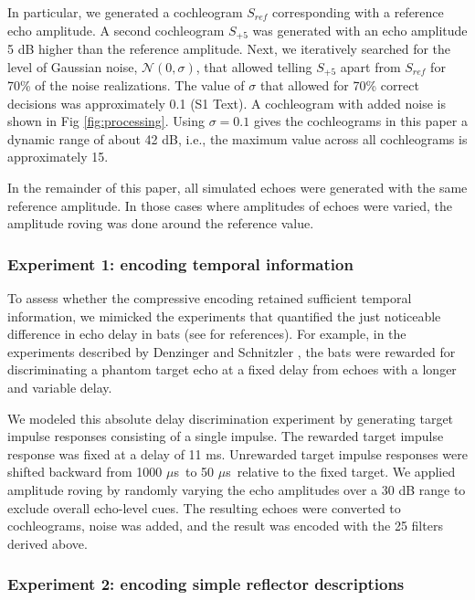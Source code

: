 \documentclass[10pt,letterpaper]{article}
\newcommand{\us}{$\mu$s}
\begin{document}
In particular, we generated a cochleogram $S_{ref}$ corresponding with a reference echo amplitude. A second cochleogram $S_{+5}$ was generated with an echo amplitude 5 dB higher than the reference amplitude. Next, we iteratively searched for the level of Gaussian noise, $\mathcal{N}\left(0, \sigma \right)$, that allowed telling $S_{+5}$ apart from $S_{ref}$ for 70\% of the noise realizations. The value of $\sigma$ that allowed for 70\% correct decisions was approximately 0.1 (S1 Text). A cochleogram with added noise is shown in Fig \ref{fig:processing}. Using $\sigma = 0.1$ gives the cochleograms in this paper a dynamic range of about 42 dB, i.e., the maximum value across all cochleograms is approximately 15.

In the remainder of this paper, all simulated echoes were generated with the same reference amplitude. In those cases where amplitudes of echoes were varied, the amplitude roving was done around the reference value. 

\subsubsection{Experiment 1: encoding temporal information}

To assess whether the compressive encoding retained sufficient temporal information, we mimicked the experiments that quantified the just noticeable difference in echo delay in bats (see \cite{Goerlitz2010} for references). For example, in the experiments described by Denzinger and Schnitzler \cite{Denzinger1994}, the bats were rewarded for discriminating a phantom target echo at a fixed delay from echoes with a longer and variable delay.

We modeled this absolute delay discrimination experiment by generating target impulse responses consisting of a single impulse. The rewarded target impulse response was fixed at a delay of 11 ms. Unrewarded target impulse responses were shifted backward from 1000 \us \ to 50 \us \ relative to the fixed target. We applied amplitude roving by randomly varying the echo amplitudes over a 30 dB range to exclude overall echo-level cues. The resulting echoes were converted to cochleograms, noise was added, and the result was encoded with the 25 filters derived above.

\subsubsection{Experiment 2: encoding simple reflector descriptions}
\end{document}
